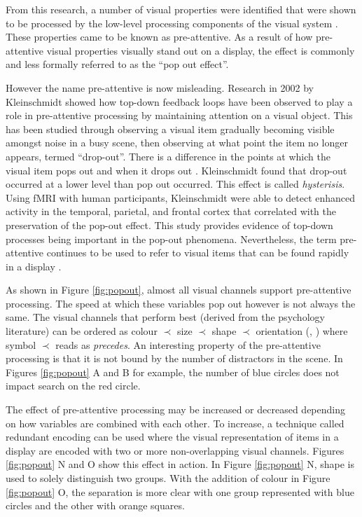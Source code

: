 From this research, a number of visual properties were identified that were shown to be processed by the low-level processing components of the visual system \cite{healey11}.
These properties came to be known as pre-attentive.
As a result of how pre-attentive visual properties visually stand out on a display, the effect is commonly and less formally referred to as the ``pop out effect''.

However the name pre-attentive is now misleading.
Research in 2002 by Kleinschmidt \etal \cite{kleinschmidt2002} showed how top-down feedback loops have been observed to play a role in pre-attentive processing by maintaining attention on a visual object.
This has been studied through observing a visual item gradually becoming visible amongst noise in a busy scene, then observing at what point the item no longer appears, termed ``drop-out''.
There is a difference in the points at which the visual item pops out and when it drops out \cite{kleinschmidt2002}. 
Kleinschmidt \etal found that drop-out occurred at a lower level than pop out occurred.
This effect is called \emph{hysterisis}.
Using fMRI with human participants, Kleinschmidt \etal \cite{kleinschmidt2002} were able to detect enhanced activity in the temporal, parietal, and frontal cortex that correlated with the preservation of the pop-out effect.
This study provides evidence of top-down processes being important in the pop-out phenomena.
Nevertheless, the term pre-attentive continues to be used to refer to visual items that can be found rapidly in a display \cite{healey11}. 


As shown in Figure \ref{fig:popout}, almost all visual channels support pre-attentive processing.
The speed at which these variables pop out however is not always the same.
The visual channels that perform best (derived from the psychology literature) can be ordered as colour $\prec$ size $\prec$ shape $\prec$ orientation (\eg, \cite{williams67,quinlan87,ropinski11}) where symbol $\prec$ reads as \emph{precedes}.
An interesting property of the pre-attentive processing is that it is not bound by the number of distractors in the scene\cite{ware13}.
In Figures \ref{fig:popout} A and B for example, the number of blue circles does not impact search on the red circle.

The effect of pre-attentive processing may be increased or decreased depending on how variables are combined with each other.
To increase, a technique called redundant encoding can be used where the visual representation of items in a display are encoded with two or more non-overlapping visual channels.
Figures \ref{fig:popout} N and O show this effect in action.
In Figure \ref{fig:popout} N, shape is used to solely distinguish two groups.
With the addition of colour in Figure \ref{fig:popout} O, the separation is more clear with one group represented with blue circles and the other with orange squares. 

